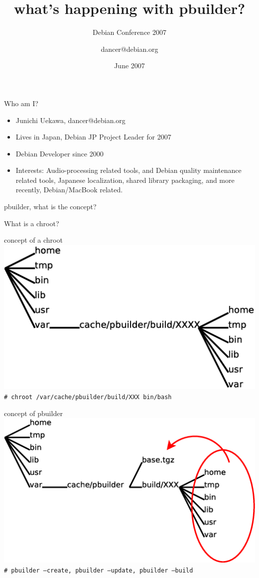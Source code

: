 \documentclass[dvipdfm,12pt,times]{beamer}
\title{what's happening with pbuilder?}
\subtitle{Debian Conference 2007}
\author{dancer@debian.org}
\date{June 2007}
\newcommand{\emtext}[1]{
\begin{frame}{}
 
{\Huge #1
}
\end{frame}
}
\begin{document}
\frame{\titlepage{}}


\begin{frame}{Who am I?}
\begin{itemize}
 \item Junichi Uekawa, dancer@debian.org
 \item Lives in Japan, Debian JP Project Leader for 2007
 \item Debian Developer since 2000
 \item Interests: Audio-processing related tools, and 
       Debian quality maintenance related tools,
       Japanese localization, shared library packaging, 
       and more recently, Debian/MacBook related.
\end{itemize}
\end{frame}

\emtext{pbuilder, what is the concept?}

\emtext{What is a chroot?}

\begin{frame}{concept of a chroot}
 \includegraphics[width=1\hsize]{chroot.eps}\\
\texttt{\# chroot /var/cache/pbuilder/build/XXX bin/bash}
\end{frame}

\begin{frame}{concept of pbuilder}
 \includegraphics[width=1\hsize]{chroot-pbuilder.eps}\\
\texttt{\# pbuilder --create, pbuilder --update, pbuilder --build}
\end{frame}
\end{document}
